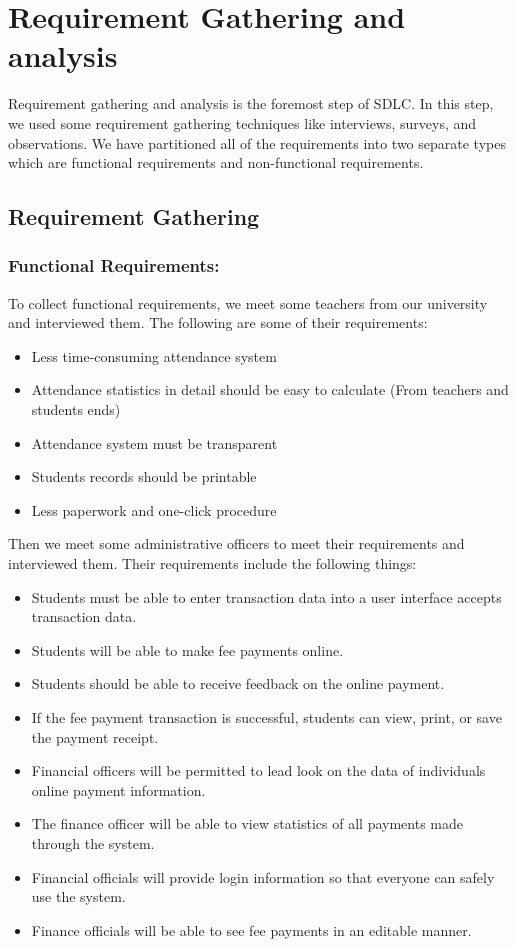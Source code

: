 \section{Requirement Gathering and analysis}\label{sec:rga}
Requirement gathering and analysis is the foremost step of SDLC. In this step, we used some requirement gathering techniques like interviews, surveys, and observations. We have partitioned all of the requirements into two separate types which are functional requirements and non-functional requirements.
\subsection{Requirement Gathering}\label{sub:reqgather}
\subsubsection{Functional Requirements:}\label{subsub:funreq}
To collect functional requirements, we meet some teachers from our university and interviewed them. The following are some of their requirements:
\begin{itemize}
	\item Less time-consuming attendance system 
	\item Attendance statistics in detail  should be easy to calculate (From teachers and students ends)
	\item Attendance system must be transparent
	\item Students records should be printable
	\item Less paperwork and one-click procedure
\end{itemize}
Then we meet some administrative officers to meet their requirements and interviewed them. Their requirements include the following things:
\begin{itemize}
	\item Students must be able to enter transaction data into a user interface accepts transaction data.
	\item Students will be able to make fee payments online.
	\item Students should be able to receive feedback on the  online payment.
	\item If the fee payment transaction is successful, students can view, print, or save the payment receipt.
	\item Financial officers will be permitted to lead look on the data of individuals online payment information.
	\item The finance officer will be able to view statistics of all payments made through the system.
	\item Financial officials will provide login information so that  everyone can safely use the system.
	\item Finance officials will be able to see fee payments in an editable manner.
\end{itemize}
